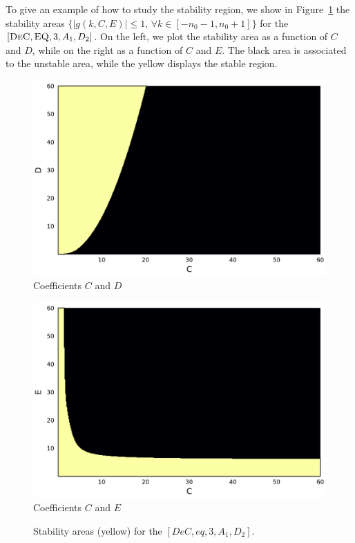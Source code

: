 \begin{example}
	To give an example of how to study the stability region, we show in Figure~\ref{fig: exa_ImExDeC3_diff2_adv1} the stability areas $\lbrace |g(k,C,E)|\leq 1 ,\, \forall k \in [-n_0-1,n_0+1]\rbrace$ for the $[\textsc{DeC},\textsc{EQ},3, A_1,D_2]$. On the left, we plot the stability area as a function of $C$ and $D$, while on the right as a function of $C$ and $E$. The black area is associated to the unstable area, while the yellow displays the stable region.
	\begin{figure}[!h]
		\centering
		\begin{minipage}[t]{0.45\textwidth}
			\includegraphics[width=\textwidth]{pdf/pdepics/exa_DeC3_CD.pdf}
			\centering
			Coefficients $C$ and $D$
		\end{minipage} 
		\begin{minipage}[t]{0.45\textwidth}
			\includegraphics[width=\textwidth]{pdf/pdepics/exa_DeC3_CE.pdf}
			\centering
			Coefficients $C$ and $E$
		\end{minipage}
		\caption{Stability areas (yellow) for the $[DeC,eq,3, A_1,D_2]$.}
		\label{fig: exa_ImExDeC3_diff2_adv1}
	\end{figure}
\end{example}

